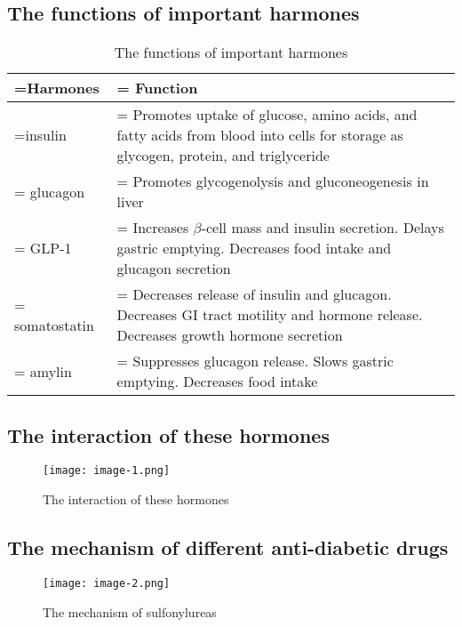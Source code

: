 \documentclass{article}
\newcommand\columnC{\centering\arraybackslash}
\begin{document}
\subsection{The functions of important harmones}

\begin{table}[H]
    \centering
    \caption{The functions of important harmones}
    \quad

    \begin{tabularx}{\textwidth}{
        >{\columnC\hsize=0.4\hsize\linewidth=\hsize}X
        >{\columnC\hsize=1.6\hsize\linewidth=\hsize}X
    }
        \toprule[1.5pt]
        Harmones & Function \\
        \midrule
        insulin & Promotes uptake of glucose, amino acids, and fatty acids from  blood into cells for storage as glycogen, protein, and triglyceride\\
        \midrule
        glucagon & Promotes glycogenolysis and gluconeogenesis in liver\\
        \midrule
        GLP-1 & Increases $\beta$-cell mass and insulin secretion. Delays gastric emptying. Decreases food intake and glucagon secretion\\
        \midrule
        somatostatin & Decreases release of insulin and glucagon. Decreases GI tract motility and hormone release. Decreases growth hormone secretion\\
        \midrule
        amylin & Suppresses glucagon release. Slows gastric emptying. Decreases food intake\\
        \bottomrule[1.5pt]
    \end{tabularx}
\end{table}

\subsection{The interaction of these hormones}

\begin{figure}[H]
    \centering
    \caption{The interaction of these hormones}
    \texttt{[image: image-1.png]}
\end{figure}

\subsection{The mechanism of different anti-diabetic drugs}

\begin{figure}[H]
    \centering
    \caption{The mechanism of sulfonylureas}
    \texttt{[image: image-2.png]}
\end{figure}
\end{document}

